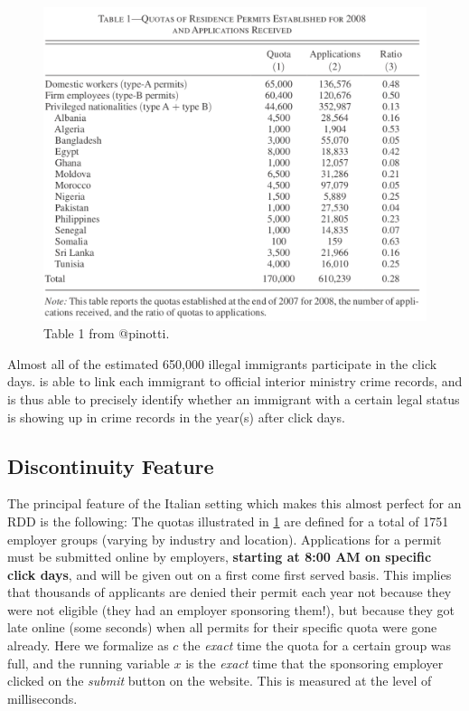 \documentclass[]{book}
\begin{document}
\begin{figure}

{\centering \includegraphics[width=16.14in]{images/pinotti1} 

}

\caption{Table 1 from @pinotti.}\label{fig:pin1}
\end{figure}

Almost all of the estimated 650,000 illegal immigrants participate in the click days. \citet{pinotti} is able to link each immigrant to official interior ministry crime records, and is thus able to precisely identify whether an immigrant with a certain legal status is showing up in crime records in the year(s) after click days.

\hypertarget{discontinuity-feature}{%
\subsection{Discontinuity Feature}\label{discontinuity-feature}}

The principal feature of the Italian setting which makes this almost perfect for an RDD is the following: The quotas illustrated in \ref{fig:pin1} are defined for a total of 1751 employer groups (varying by industry and location). Applications for a permit must be submitted online by employers, \textbf{starting at 8:00 AM on specific click days}, and will be given out on a first come first served basis. This implies that thousands of applicants are denied their permit each year not because they were not eligible (they had an employer sponsoring them!), but because they got late online (some seconds) when all permits for their specific quota were gone already. Here we formalize as \(c\) the \emph{exact} time the quota for a certain group was full, and the running variable \(x\) is the \emph{exact} time that the sponsoring employer clicked on the \emph{submit} button on the website. This is measured at the level of milliseconds.
\end{document}
